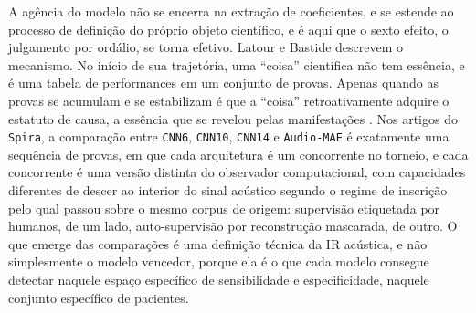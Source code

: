 A agência do modelo não se encerra na extração de coeficientes, e se estende ao processo de definição do próprio objeto científico, e é aqui que o sexto efeito, o julgamento por ordálio, se torna efetivo. Latour e Bastide descrevem o mecanismo. No início de sua trajetória, uma \enquote{coisa} científica não tem essência, e é uma tabela de performances em um conjunto de provas. Apenas quando as provas se acumulam e se estabilizam é que a \enquote{coisa} retroativamente adquire o estatuto de causa, a essência que se revelou pelas manifestações \parencite[pp.~63--64]{Latour1986Writing}. Nos artigos do \texttt{Spira}, a comparação entre \texttt{CNN6}, \texttt{CNN10}, \texttt{CNN14} e \texttt{Audio-MAE} é exatamente uma sequência de provas, em que cada arquitetura é um concorrente no torneio, e cada concorrente é uma versão distinta do observador computacional, com capacidades diferentes de descer ao interior do sinal acústico segundo o regime de inscrição pelo qual passou sobre o mesmo corpus de origem: supervisão etiquetada por humanos, de um lado, auto-supervisão por reconstrução mascarada, de outro. O que emerge das comparações é uma definição técnica da IR acústica, e não simplesmente o modelo vencedor, porque ela é o que cada modelo consegue detectar naquele espaço específico de sensibilidade e especificidade, naquele conjunto específico de pacientes.

